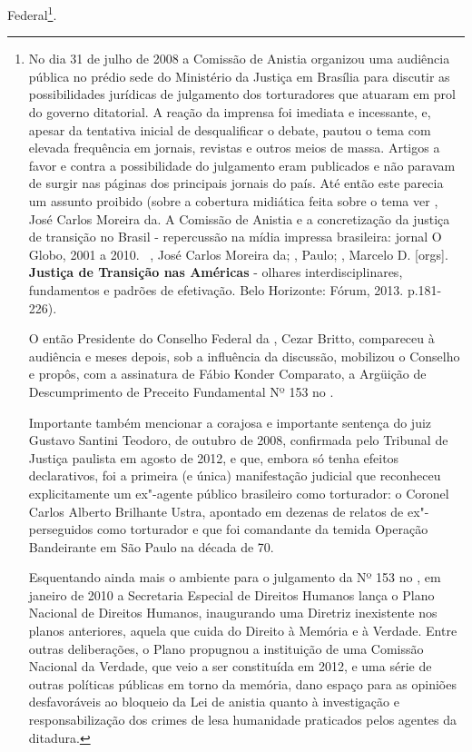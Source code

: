 Federal\footnote{No dia 31 de julho de 2008 a Comissão de Anistia
  organizou uma audiência pública no prédio sede do Ministério da
  Justiça em Brasília para discutir as possibilidades jurídicas de
  julgamento dos torturadores que atuaram em prol do governo ditatorial.
  A reação da imprensa foi imediata e incessante, e, apesar da tentativa
  inicial de desqualificar o debate, pautou o tema com elevada
  frequência em jornais, revistas e outros meios de massa. Artigos a
  favor e contra a possibilidade do julgamento eram publicados e não
  paravam de surgir nas páginas dos principais jornais do país. Até
  então este parecia um assunto proibido (sobre a cobertura midiática
  feita sobre o tema ver  , José Carlos Moreira da. A Comissão
  de Anistia e a concretização da justiça de transição no Brasil -
  repercussão na mídia impressa brasileira: jornal O Globo, 2001 a
  2010.~ , José Carlos Moreira da; , Paulo; ,
  Marcelo D. {[}orgs{]}. \textbf{Justiça de Transição nas Américas} -
  olhares interdisciplinares, fundamentos e padrões de efetivação. Belo
  Horizonte: Fórum, 2013. p.181-226).

  O então Presidente do Conselho Federal da , Cezar Britto,
  compareceu à audiência e meses depois, sob a influência da discussão,
  mobilizou o Conselho e propôs, com a assinatura de Fábio Konder
  Comparato, a Argüição de Descumprimento de Preceito Fundamental Nº 153
  no .

  Importante também mencionar a corajosa e importante sentença do juiz
  Gustavo Santini Teodoro, de outubro de 2008, confirmada pelo Tribunal
  de Justiça paulista em agosto de 2012, e que, embora só tenha efeitos
  declarativos, foi a primeira (e única) manifestação judicial que
  reconheceu explicitamente um ex"-agente público brasileiro como
  torturador: o Coronel Carlos Alberto Brilhante Ustra, apontado em
  dezenas de relatos de ex"-perseguidos como torturador e que foi
  comandante da temida Operação Bandeirante em São Paulo na década de
  70.

  Esquentando ainda mais o ambiente para o julgamento da  Nº 153 no
  , em janeiro de 2010 a Secretaria Especial de Direitos Humanos
  lança o  Plano Nacional de Direitos Humanos, inaugurando uma
  Diretriz inexistente nos planos anteriores, aquela que cuida do
  Direito à Memória e à Verdade. Entre outras deliberações, o Plano
  propugnou a instituição de uma Comissão Nacional da Verdade, que veio
  a ser constituída em 2012, e uma série de outras políticas públicas em
  torno da memória, dano espaço para as opiniões desfavoráveis ao
  bloqueio da Lei de anistia quanto à investigação e responsabilização
  dos crimes de lesa humanidade praticados pelos agentes da ditadura.}.

